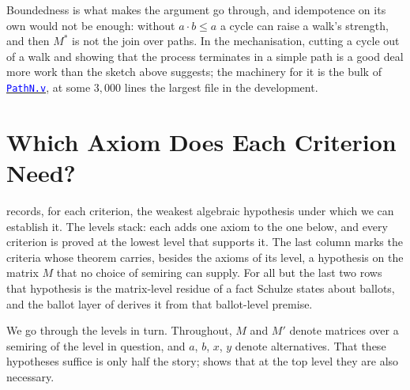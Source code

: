 \documentclass[a4paper,UKenglish,cleveref,autoref,thm-restate,anonymous]{lipics-v2021}
\newcommand{\Mstar}{M^{\ast}}
\newcommand{\anonrepo}{https://anonymous.4open.science/r/Semiring_graph_algorithm-000E}
\newcommand{\rocqfile}[2]{\href{\anonrepo/#1}{\textcolor{blue}{\texttt{#2}}}}
\begin{document}
Boundedness is what makes the argument go through, and idempotence on its
own would not be enough: without $a \cdot b \leq a$ a cycle can raise a
walk's strength, and then $\Mstar$ is not the join over paths. In the
mechanisation, cutting a cycle out of a walk and showing that the process
terminates in a simple path is a good deal more work than the sketch above
suggests; the machinery for it is the bulk of
\rocqfile{algorithm/PathN.v}{PathN.v}, at some $3{,}000$ lines the largest
file in the development.


\section{Which Axiom Does Each Criterion Need?}\label{sec:classification}

 records, for each criterion, the weakest
algebraic hypothesis under which we can establish it. The levels stack:
each adds one axiom to the one below, and every criterion is proved at the
lowest level that supports it. The last column marks the criteria whose
theorem carries, besides the axioms of its level, a hypothesis on the
matrix $M$ that no choice of semiring can supply. For all but the last two
rows that hypothesis is the matrix-level residue of a fact Schulze states
about ballots, and the ballot layer of  derives it
from that ballot-level premise.

We go through the levels in turn. Throughout, $M$ and $M'$ denote matrices
over a semiring of the level in question, and $a$, $b$, $x$, $y$ denote
alternatives. That these hypotheses suffice is only half the story;
 shows that at the top level they are also
necessary.
\end{document}
